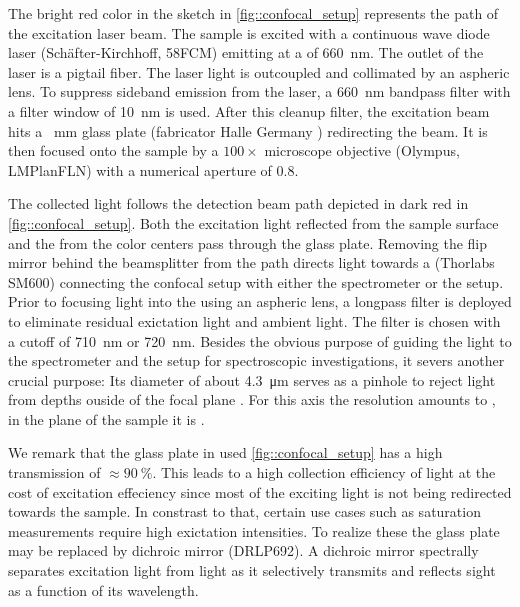 		The bright red color in the sketch in \autoref{fig::confocal_setup} represents the path of the excitation laser beam.
		The sample is excited with a continuous wave diode laser (Sch\"after-Kirchhoff, 58FCM) emitting at a \wl of \SI{660}{\nano\meter}.
		The outlet of the laser is a pigtail fiber.
		The laser light is outcoupled and collimated by an aspheric lens.
		To suppress sideband emission from the laser, a \SI{660}{\nm} bandpass filter with a filter window of \SI{10}{\nm} is used.
		After this cleanup filter, the excitation beam hits a \SI{}{\milli\meter} glass plate (fabricator Halle Germany ) redirecting the beam. It is then focused onto the sample by a $100 \times$ microscope objective (Olympus, LMPlanFLN) with a numerical aperture of $0.8$.

		The collected light follows the detection beam path depicted in dark red in \autoref{fig::confocal_setup}.
		Both the excitation light reflected from the sample surface and the \fl from the color centers pass through the glass plate.
		Removing the flip mirror behind the beamsplitter from the path directs light towards a \smf (Thorlabs SM600) connecting the confocal setup with either the spectrometer or the \hbt setup. Prior to focusing light into the \smf using an aspheric lens, a longpass filter is deployed to eliminate residual exictation light and ambient light.
		The filter is chosen with a cutoff \wl of \SI{710}{\nm} or \SI{720}{\nm}.
		Besides the obvious purpose of guiding the \pl light to the spectrometer and the \HBT setup for spectroscopic investigations, it severs another crucial purpose:
		Its diameter of about \SI{4.3}{\micro\meter} serves as a pinhole to reject \pl light from depths ouside of the focal plane \cite{Santori2010}.
		For this axis the resolution amounts to , in the plane of the sample it is .

		We remark that the glass plate in used \autoref{fig::confocal_setup} has a high transmission of $\approx \SI{90}{\percent}$. This leads to a high collection efficiency of \fl light at the cost of excitation effeciency since most of the exciting light is not being redirected towards the sample. In constrast to that, certain use cases such as saturation measurements require high exictation intensities. To realize these the glass plate may be replaced by dichroic mirror (DRLP692). A dichroic mirror spectrally separates excitation light from \pl light as it selectively transmits and reflects sight as a function of its wavelength.


